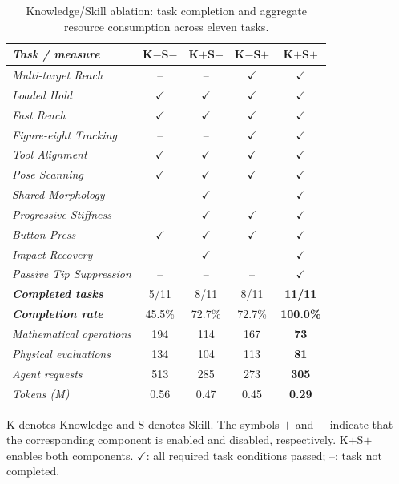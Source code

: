 \begin{table}[!htbp]
\centering
\caption{Knowledge/Skill ablation: task completion and aggregate resource consumption across eleven tasks.}
\label{tab:resource-ablation}
\papertablestyle
\begin{tabular*}{\columnwidth}{@{\extracolsep{\fill}}>{\itshape}lcccc@{}}
\toprule
\normalfont\textbf{Task / measure} & \textbf{K$-$S$-$} & \textbf{K$+$S$-$} & \textbf{K$-$S$+$} & \textbf{K$+$S$+$} \\
\midrule
Multi-target Reach & -- & -- & $\checkmark$ & $\checkmark$ \\
Loaded Hold & $\checkmark$ & $\checkmark$ & $\checkmark$ & $\checkmark$ \\
Fast Reach & $\checkmark$ & $\checkmark$ & $\checkmark$ & $\checkmark$ \\
Figure-eight Tracking & -- & -- & $\checkmark$ & $\checkmark$ \\
Tool Alignment & $\checkmark$ & $\checkmark$ & $\checkmark$ & $\checkmark$ \\
Pose Scanning & $\checkmark$ & $\checkmark$ & $\checkmark$ & $\checkmark$ \\
Shared Morphology & -- & $\checkmark$ & -- & $\checkmark$ \\
Progressive Stiffness & -- & $\checkmark$ & $\checkmark$ & $\checkmark$ \\
Button Press & $\checkmark$ & $\checkmark$ & $\checkmark$ & $\checkmark$ \\
Impact Recovery & -- & $\checkmark$ & -- & $\checkmark$ \\
Passive Tip Suppression & -- & -- & -- & $\checkmark$ \\
\midrule
\normalfont\textbf{Completed tasks} & 5/11 & 8/11 & 8/11 & \textbf{11/11} \\
\normalfont\textbf{Completion rate} & 45.5\% & 72.7\% & 72.7\% & \textbf{100.0\%} \\
\midrule
\normalfont Mathematical operations & 194 & 114 & 167 & \textbf{73} \\
\normalfont Physical evaluations & 134 & 104 & 113 & \textbf{81} \\
\normalfont Agent requests & 513 & 285 & 273 & \textbf{305} \\
\normalfont Tokens (M) & 0.56 & 0.47 & 0.45 & \textbf{0.29} \\
\bottomrule
\end{tabular*}
\par\smallskip\raggedright\footnotesize
K denotes Knowledge and S denotes Skill. The symbols $+$ and $-$ indicate that the corresponding component is enabled and disabled, respectively. K$+$S$+$ enables both components. $\checkmark$: all required task conditions passed; --: task not completed.
\end{table}
